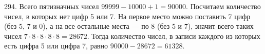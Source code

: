 294. Всего пятизначных чисел $99999-10000+1=90000.$ Посчитаем количество чисел, в которых нет цифр 5 или 7. На первое место можно поставить 7 цифр (без 5, 7 и 0), а на все остальные места --- по 8 (без 5 и 7), значит всего таких чисел $7\cdot8\cdot8\cdot8\cdot8=28672.$ Тогда количество чисел, в записи каждого из которых есть цифра 5 или цифра 7, равно $90000-28672=61328.$\\
